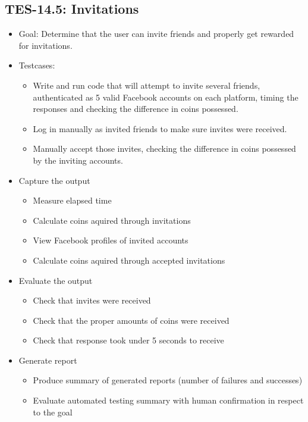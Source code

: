 \subsection{TES-14.5: Invitations}
\begin{itemize}
\item Goal: Determine that the user can invite friends and properly get 
rewarded for invitations.

\item Testcases: 
\begin{itemize}
\item Write and run code that will attempt to invite several friends, 
authenticated as 5 valid Facebook accounts on each platform, 
timing the responses and checking the difference in coins possessed.
\item Log in manually as invited friends to make sure invites were received.
\item Manually accept those invites, checking the difference in coins 
possessed by the inviting accounts.
\end{itemize}

\item Capture the output 
\begin{itemize}
\item Measure elapsed time 
\item Calculate coins aquired through invitations
\item View Facebook profiles of invited accounts
\item Calculate coins aquired through accepted invitations
\end{itemize}

\item Evaluate the output 
\begin{itemize}
\item Check that invites were received
\item Check that the proper amounts of coins were received
\item Check that response took under 5 seconds to receive
\end{itemize}

\item Generate report 
\begin{itemize}
\item Produce summary of generated reports (number of failures and successes)
\item Evaluate automated testing summary with human confirmation in respect to the goal
\end{itemize}
\end{itemize}

